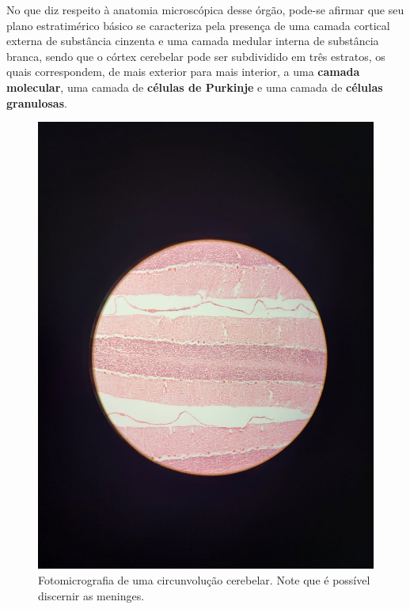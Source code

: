 \documentclass[
]{book}
\begin{document}
No que diz respeito à anatomia microscópica desse órgão, pode-se afirmar que seu plano estratimérico básico se caracteriza pela presença de uma camada cortical externa de substância cinzenta e uma camada medular interna de substância branca, sendo que o córtex cerebelar pode ser subdividido em três estratos, os quais correspondem, de mais exterior para mais interior, a uma \textbf{camada molecular}, uma camada de \textbf{células de Purkinje} e uma camada de \textbf{células granulosas}.

\begin{figure}
\centering
\includegraphics{images/neuro-cerebelo.jpeg}
\caption{\label{fig:unnamed-chunk-5}Fotomicrografia de uma circunvolução cerebelar. Note que é possível discernir as meninges.}
\end{figure}
\end{document}
